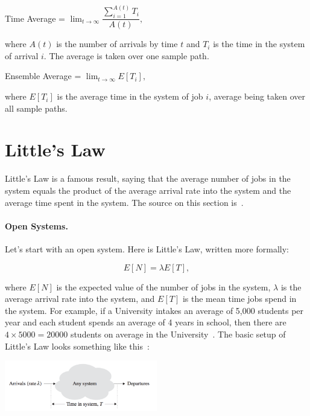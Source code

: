 \documentclass[a4paper]{report}
\begin{document}
\begin{center}
	Time Average = $\lim_{t\to\infty}\dfrac{\sum_{i=1}^{A(t)} T_{i}}{A(t)},$
\end{center}

where $A(t)$ is the number of arrivals by time $t$ and $T_{i}$ is the time in the system of arrival $i$. The average is taken over one sample path.

\begin{center}
	Ensemble Average = $\lim_{t\to\infty}E[T_{i}],$
\end{center}

where $E[T_{i}]$ is the average time in the system of job $i$, average being taken over all sample paths.

\section*{Little's Law}
Little's Law is a famous result, saying that the average number of jobs in the system equals the product of the average arrival rate into the system and the average time spent in the system. The source on this section is~\cite{pmd}.

\paragraph{Open Systems.} Let's start with an open system. Here is Little's Law, written more formally:

\[
	E[N] = \lambda E[T],
\]

where $E[N]$ is the expected value of the number of jobs in the system, $\lambda$ is the average arrival rate into the system, and $E[T]$ is the mean time jobs spend in the system. For example, if a University intakes an average of 5,000 students per year and each student spends an average of 4 years in school, then there are $4 \times 5000=20000$ students on average in the University~\cite{sigman-little-law}. The basic setup of Little's Law looks something like this~\cite{pmd}:

\begin{center}
	\includegraphics[width=0.5\textwidth]{images/littleslaw.png}
\end{center}
\end{document}
